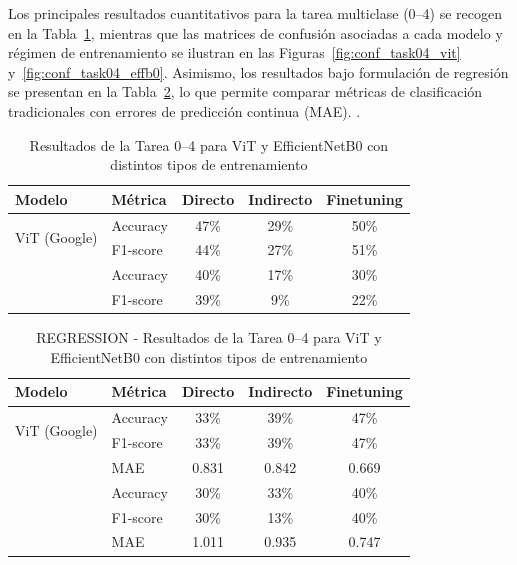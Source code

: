 \documentclass[11pt,spanish,listoffigures,listoftables]{tfgetsinf}
\begin{document}
Los principales resultados cuantitativos para la tarea multiclase (0--4) se recogen en la Tabla~\ref{tab:model_comparison_results}, mientras que las matrices de confusión asociadas a cada modelo y régimen de entrenamiento se ilustran en las Figuras~\ref{fig:conf_task04_vit} y~\ref{fig:conf_task04_effb0}. Asimismo, los resultados bajo formulación de regresión se presentan en la Tabla~\ref{tab:model_comparison_results_regression}, lo que permite comparar métricas de clasificación tradicionales con errores de predicción continua (MAE).
.

\begin{table}[H]
	\centering
	\caption{Resultados de la Tarea 0--4 para ViT y EfficientNetB0 con distintos tipos de entrenamiento}
	\label{tab:model_comparison_results}
	\begin{tabular}{@{} l l c c c @{}}
		\toprule
		\textbf{Modelo} & \textbf{Métrica} & \textbf{Directo} & \textbf{Indirecto} & \textbf{Finetuning} \\
		\midrule
		\multirow{2}{*}{ViT (Google)}
		                & Accuracy         & 47\%             & 29\%               & 50\%                \\
		                & F1-score         & 44\%             & 27\%               & 51\%                \\
		\addlinespace
		\multirow{2}{*}{EfficientNetB0}
		                & Accuracy         & 40\%             & 17\%               & 30\%                \\
		                & F1-score         & 39\%             & 9\%                & 22\%                \\
		\bottomrule
	\end{tabular}
\end{table}
\begin{table}[H]
	\centering
	\caption{REGRESSION - Resultados de la Tarea 0--4 para ViT y EfficientNetB0 con distintos tipos de entrenamiento}
	\label{tab:model_comparison_results_regression}
	\begin{tabular}{@{} l l c c c @{}}
		\toprule
		\textbf{Modelo} & \textbf{Métrica} & \textbf{Directo} & \textbf{Indirecto} & \textbf{Finetuning} \\
		\midrule
		\multirow{2}{*}{ViT (Google)}
		                & Accuracy         & 33\%             & 39\%               & 47\%                \\
		                & F1-score         & 33\%             & 39\%               & 47\%                \\
		                & MAE              & 0.831            & 0.842              & 0.669               \\
		\addlinespace
		\multirow{2}{*}{EfficientNetB0}
		                & Accuracy         & 30\%             & 33\%               & 40\%                \\
		                & F1-score         & 30\%             & 13\%               & 40\%                \\
		                & MAE              & 1.011            & 0.935              & 0.747               \\
		\bottomrule
	\end{tabular}
\end{table}
\end{document}
